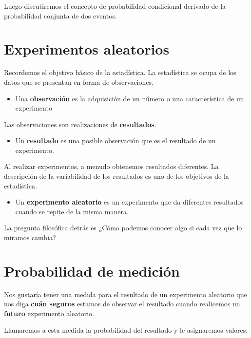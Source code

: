 \documentclass[
]{book}
\providecommand{\tightlist}{%
  \setlength{\itemsep}{0pt}\setlength{\parskip}{0pt}}
\begin{document}
Luego discutiremos el concepto de probabilidad condicional derivado de la probabilidad conjunta de dos eventos.

\hypertarget{experimentos-aleatorios-1}{%
\section{Experimentos aleatorios}\label{experimentos-aleatorios-1}}

Recordemos el objetivo básico de la estadística. La estadística se ocupa de los datos que se presentan en forma de observaciones.

\begin{itemize}
\tightlist
\item
  Una \textbf{observación} es la adquisición de un número o una característica de un experimento
\end{itemize}

Las observaciones son realizaciones de \textbf{resultados}.

\begin{itemize}
\tightlist
\item
  Un \textbf{resultado} es una posible observación que es el resultado de un experimento.
\end{itemize}

Al realizar experimentos, a menudo obtenemos resultados diferentes. La descripción de la variabilidad de los resultados es uno de los objetivos de la estadística.

\begin{itemize}
\tightlist
\item
  Un \textbf{experimento aleatorio} es un experimento que da diferentes resultados cuando se repite de la misma manera.
\end{itemize}

La pregunta filosófica detrás es ¿Cómo podemos conocer algo si cada vez que lo miramos cambia?

\hypertarget{probabilidad-de-mediciuxf3n}{%
\section{Probabilidad de medición}\label{probabilidad-de-mediciuxf3n}}

Nos gustaría tener una medida para el resultado de un experimento aleatorio que nos diga \textbf{cuán seguros} estamos de observar el resultado cuando realicemos un \textbf{futuro} experimento aleatorio.

Llamaremos a esta medida la probabilidad del resultado y le asignaremos valores:
\end{document}
